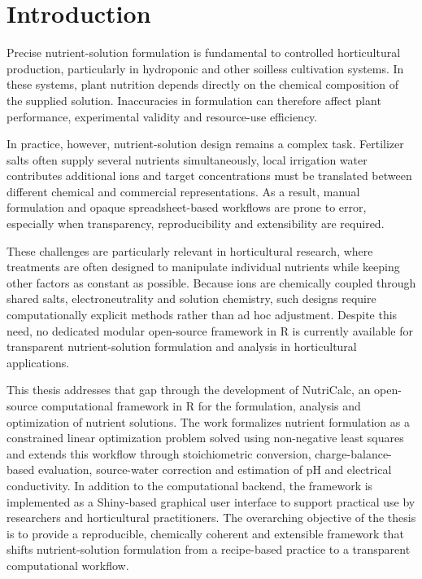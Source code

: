 \documentclass[
  letterpaper,
  DIV=11,
  numbers=noendperiod]{scrreprt}
\newcounter{frontmatterpages}
\newcommand{\savefrontmatter}{\setcounter{frontmatterpages}{\value{page}}}
\begin{document}
\savefrontmatter
\clearpage
{}
\setcounter{page}{1}

\chapter{Introduction}\label{introduction}

Precise nutrient-solution formulation is fundamental to controlled
horticultural production, particularly in hydroponic and other soilless
cultivation systems. In these systems, plant nutrition depends directly
on the chemical composition of the supplied solution. Inaccuracies in
formulation can therefore affect plant performance, experimental
validity and resource-use efficiency.

In practice, however, nutrient-solution design remains a complex task.
Fertilizer salts often supply several nutrients simultaneously, local
irrigation water contributes additional ions and target concentrations
must be translated between different chemical and commercial
representations. As a result, manual formulation and opaque
spreadsheet-based workflows are prone to error, especially when
transparency, reproducibility and extensibility are required.

These challenges are particularly relevant in horticultural research,
where treatments are often designed to manipulate individual nutrients
while keeping other factors as constant as possible. Because ions are
chemically coupled through shared salts, electroneutrality and solution
chemistry, such designs require computationally explicit methods rather
than ad hoc adjustment. Despite this need, no dedicated modular
open-source framework in R is currently available for transparent
nutrient-solution formulation and analysis in horticultural
applications.

This thesis addresses that gap through the development of NutriCalc, an
open-source computational framework in R for the formulation, analysis
and optimization of nutrient solutions. The work formalizes nutrient
formulation as a constrained linear optimization problem solved using
non-negative least squares and extends this workflow through
stoichiometric conversion, charge-balance-based evaluation, source-water
correction and estimation of pH and electrical conductivity. In addition
to the computational backend, the framework is implemented as a
Shiny-based graphical user interface to support practical use by
researchers and horticultural practitioners. The overarching objective
of the thesis is to provide a reproducible, chemically coherent and
extensible framework that shifts nutrient-solution formulation from a
recipe-based practice to a transparent computational workflow.
\end{document}
